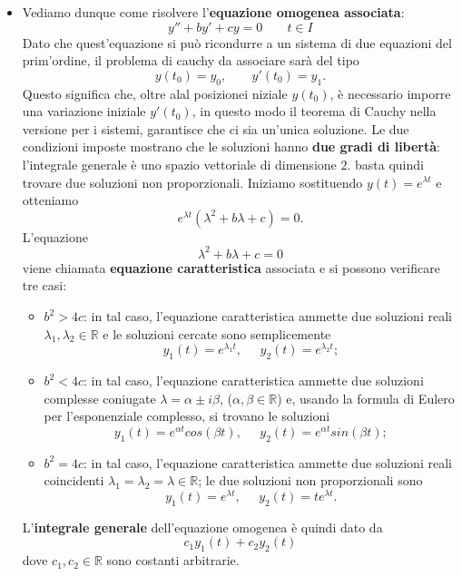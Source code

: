 \begin{itemize}
    \item Vediamo dunque come risolvere l'\textbf{equazione omogenea associata}:
    \[
        y'' + by' + cy = 0 \;\;\;\;\;\;\;t \in I
    \]
    Dato che quest'equazione si può ricondurre a un sistema di due equazioni del prim'ordine, il problema di cauchy da associare sarà del tipo
    \[
        y(t_0) = y_0, \;\;\;\;\;\;\;y'(t_0)=y_1.
    \]
    Questo significa che, oltre alal posizionei niziale $y(t_0)$, è necessario imporre una variazione iniziale $y'(t_0)$, in questo modo il teorema di Cauchy nella versione per i sistemi, garantisce che ci sia un'unica soluzione.\newline
    Le due condizioni imposte mostrano che le soluzioni hanno \textbf{due gradi di libertà}: l'integrale generale è uno spazio vettoriale di dimensione $2$. basta quindi trovare due soluzioni non proporzionali.\newline
    Iniziamo sostituendo $y(t) = e^{\lambda t}$ e otteniamo
    \[
        e^{\lambda t} (\lambda^2 + b \lambda + c) = 0.
    \]
    L'equazione 
    \[
        \lambda^2 + b \lambda + c = 0
    \]
    viene chiamata \textbf{equazione caratteristica} associata e si possono verificare tre casi:
    \begin{itemize}
        \item $b^2 > 4c$: in tal caso, l'equazione caratteristica ammette due soluzioni reali $\lambda_1, \lambda_2 \in \mathbb{R}$ e le soluzioni cercate sono semplicemente 
        \[
            y_1(t) = e^{\lambda_1 t}, \;\;\;\;\; y_2(t) = e^{\lambda_2 t};
        \]
        \item $b^2 < 4c$: in tal caso, l'equazione caratteristica ammette due soluzioni complesse coniugate $\lambda = \alpha \pm i \beta$, ($\alpha,\beta \in \mathbb{R}$) e, usando la formula di Eulero per l'esponenziale complesso, si trovano le soluzioni
        \[
            y_1(t) = e^{\alpha t} cos(\beta t), \;\;\;\;\;y_2(t) = e^{\alpha t} sin(\beta t);
        \]
        \item $b^2 = 4c$: in tal caso, l'equazione caratteristica ammette due soluzioni reali coincidenti $\lambda_1 = \lambda_2 = \lambda \in \mathbb{R}$; le due soluzioni non proporzionali sono 
        \[
            y_1(t) = e^{\lambda t}, \;\;\;\;\; y_2(t) = t e^{\lambda t}.
        \]
    \end{itemize}
    L'\textbf{integrale generale} dell'equazione omogenea è quindi dato da
    \[
        c_1 y_1(t) + c_2 y_2(t)
    \]
    dove $c_1, c_2 \in \mathbb{R}$ sono costanti arbitrarie.

\end{itemize}
